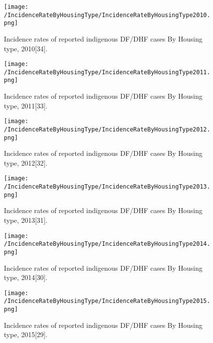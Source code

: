 \documentclass[11pt]{exam}
\begin{document}
\begin{questions}
\begin{enumerate}
\begin{figure}[H]
  \centering
   \texttt{[image: /IncidenceRateByHousingType/IncidenceRateByHousingType2010.png]} 
  \caption{Incidence rates of reported indigenous DF/DHF cases By Housing type, 2010[34].}
   \label{Incidence rate of indigenous DF/DHF cases by housing type.}
\end{figure} 

\begin{figure}[H]
  \centering
   \texttt{[image: /IncidenceRateByHousingType/IncidenceRateByHousingType2011.png]} 
  \caption{Incidence rates of reported indigenous DF/DHF cases By Housing type, 2011[33].}
   \label{Incidence rate of indigenous DF/DHF cases by housing type.}
\end{figure} 

\begin{figure}[H]
  \centering
   \texttt{[image: /IncidenceRateByHousingType/IncidenceRateByHousingType2012.png]} 
  \caption{Incidence rates of reported indigenous DF/DHF cases By Housing type, 2012[32].}
   \label{Incidence rate of indigenous DF/DHF cases by housing type.}
\end{figure} 

\begin{figure}[H]
  \centering
   \texttt{[image: /IncidenceRateByHousingType/IncidenceRateByHousingType2013.png]} 
  \caption{Incidence rates of reported indigenous DF/DHF cases By Housing type, 2013[31].}
   \label{Incidence rate of indigenous DF/DHF cases by housing type.}
\end{figure} 

\begin{figure}[H]
  \centering
   \texttt{[image: /IncidenceRateByHousingType/IncidenceRateByHousingType2014.png]} 
  \caption{Incidence rates of reported indigenous DF/DHF cases By Housing type, 2014[30].}
   \label{Incidence rate of indigenous DF/DHF cases by housing type.}
\end{figure} 

\begin{figure}[H]
  \centering
   \texttt{[image: /IncidenceRateByHousingType/IncidenceRateByHousingType2015.png]} 
  \caption{Incidence rates of reported indigenous DF/DHF cases By Housing type, 2015[29].}
   \label{Incidence rate of indigenous DF/DHF cases by housing type.}
\end{figure} 


\end{enumerate}
\end{questions}
\end{document}
